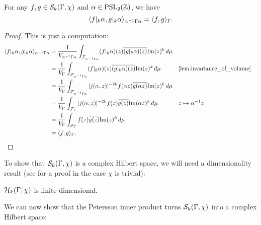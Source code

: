     \begin{proposition}\label{prop:Petersson_slash_invariance_holomorphic}
      For any $f,g \in \mathcal{S}_{k}(\Gamma,\chi)$ and $\alpha \in \mathrm{PSL}_{2}(\mathbb{Z})$, we have
      \[
        \langle f|_{k}\alpha,g|_{k}\alpha\rangle_{\alpha^{-1}\Gamma\alpha} = \langle f,g\rangle_{\Gamma}.
      \]
    \end{proposition}
    \begin{proof}
      This is just a computation:
      \begin{align*}
        \<f|_{k}\a,g|_{k}\a\>_{\a^{-1}\G\a} &= \frac{1}{V_{\a^{-1}\G\a}}\int_{\mc{F}_{\a^{-1}\G\a}}(f|_{k}\a)(z)\conj{(g|_{k}\a)(z)}\Im(z)^{k}\,d\mu \\
        &= \frac{1}{V_{\G}}\int_{\mc{F}_{\a^{-1}\G\a}}(f|_{k}\a)(z)\conj{(g|_{k}\a)(z)}\Im(z)^{k}\,d\mu && \text{\cref{lem:invariance_of_volume}} \\
        &= \frac{1}{V_{\G}}\int_{\mc{F}_{\a^{-1}\G\a}}|j(\a,z)|^{-2k}f(\a z)\conj{g(\a z)}\Im(z)^{k}\,d\mu \\
        &= \frac{1}{V_{\G}}\int_{\mc{F}_{\G}}|j(\a,z)|^{-2k}f(z)\conj{g(z)}\Im(\a z)^{k}\,d\mu && \text{$z \mapsto \a^{-1}z$} \\
        &= \frac{1}{V_{\G}}\int_{\mc{F}_{\G}}f(z)\conj{g(z)}\Im(z)^{k}\,d\mu \\
        &= \<f,g\>_{\G}.
      \end{align*}
    \end{proof}
    
    To show that $\mathcal{S}_{k}(\Gamma,\chi)$ is a complex Hilbert space, we will need a dimensionality result (see \cite{diamond2005first} for a proof in the case $\chi$ is trivial):

    \begin{theorem}\label{thm:modular_forms_finite_dimensional}
      $\mathcal{H}_{k}(\Gamma,\chi)$ is finite dimensional.
    \end{theorem}

    We can now show that the Petersson inner product turns $\mathcal{S}_{k}(\Gamma,\chi)$ into a complex Hilbert space:

